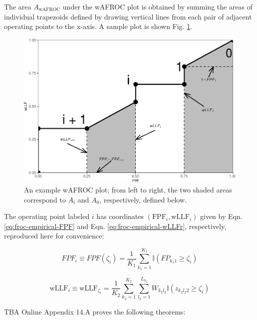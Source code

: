 \documentclass[
]{book}
\begin{document}
The area \(A_{\text{wAFROC}}\) under the wAFROC plot is obtained by summing the areas of individual trapezoids defined by drawing vertical lines from each pair of adjacent operating points to the x-axis. A sample plot is shown Fig. \ref{fig:froc-meanings-theorems}.

\begin{figure}
\centering
\includegraphics{14-froc-meanings-foms-ocs_files/figure-latex/froc-meanings-theorems-1.pdf}
\caption{\label{fig:froc-meanings-theorems}An example wAFROC plot; from left to right, the two shaded areas correspond to \(A_i\) and \(A_0\), respectively, defined below.}
\end{figure}

The operating point labeled \(i\) has coordinates \(\left ( \text{FPF}_i, \text{wLLF}_i \right )\) given by Eqn. \eqref{eq:froc-empirical-FPF} and Eqn. \eqref{eq:froc-empirical-wLLFr}, respectively, reproduced here for convenience:

\begin{equation}
FPF_i \equiv FPF \left ( \zeta_i \right ) = \frac{1}{K_1} \sum_{k_1=1}^{K_1} \mathbb{I} \left ( FP_{k_1 1} \geq \zeta_i\right )
\label{eq:froc-meanings-FPF}
\end{equation}

\begin{equation}
\text{wLLF}_i \equiv \text{wLLF}_{\zeta_i} = \frac{1}{K_2}\sum_{k_2=1}^{K_2}\sum_{l_2=1}^{L_{k_2}}W_{k_2 l_2} \mathbb{I}\left ( z_{k_2 l_2 2} \geq \zeta_i \right )
\label{eq:froc-meanings-wLLFi}
\end{equation}

TBA Online Appendix 14.A proves the following theorems:
\end{document}
